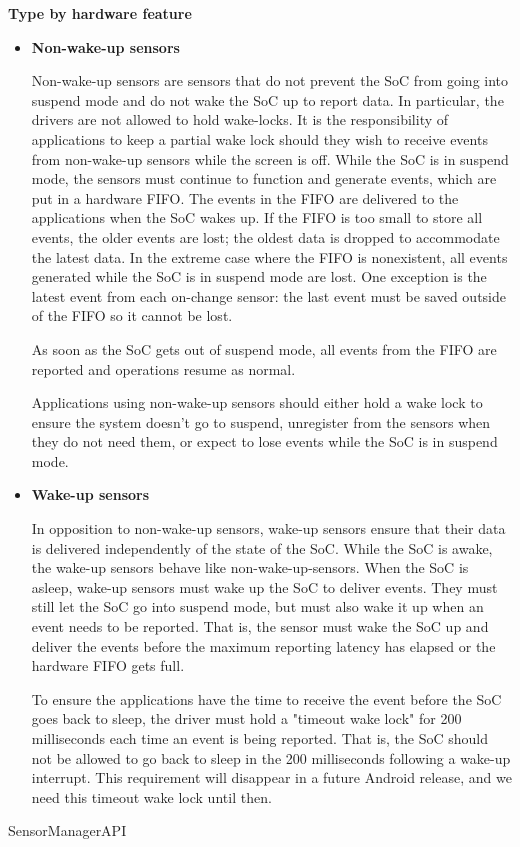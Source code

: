 \textbf{Type by hardware feature}
\begin{itemize}
\item \textbf{Non-wake-up sensors}

  Non-wake-up sensors are sensors that do not prevent the SoC from going into
  suspend mode and do not wake the SoC up to report data. In particular, the
  drivers are not allowed to hold wake-locks. It is the responsibility of
  applications to keep a partial wake lock should they wish to receive events
  from non-wake-up sensors while the screen is off. While the SoC is in suspend
  mode, the sensors must continue to function and generate events, which are put
  in a hardware FIFO.
  The events in the FIFO are delivered to the applications when the SoC wakes
  up. If the FIFO is too small to store all events, the older events are lost;
  the oldest data is dropped to accommodate the latest data. In the extreme case
  where the FIFO is nonexistent, all events generated while the SoC is in
  suspend mode are lost. One exception is the latest event from each on-change
  sensor: the last event must be saved outside of the FIFO so it cannot be lost.

  As soon as the SoC gets out of suspend mode, all events from the FIFO are
  reported and operations resume as normal.

  Applications using non-wake-up sensors should either hold a wake lock to
  ensure the system doesn't go to suspend, unregister from the sensors when they
  do not need them, or expect to lose events while the SoC is in suspend mode.

\item \textbf{Wake-up sensors}

  In opposition to non-wake-up sensors, wake-up sensors ensure that their data
  is delivered independently of the state of the SoC. While the SoC is awake,
  the wake-up sensors behave like non-wake-up-sensors. When the SoC is asleep,
  wake-up sensors must wake up the SoC to deliver events. They must still let
  the SoC go into suspend mode, but must also wake it up when an event needs to
  be reported. That is, the sensor must wake the SoC up and deliver the events
  before the maximum reporting latency has elapsed or the hardware FIFO gets
  full. %

  To ensure the applications have the time to receive the event before the SoC
  goes back to sleep, the driver must hold a "timeout wake lock" for 200
  milliseconds each time an event is being reported. That is, the SoC should not
  be allowed to go back to sleep in the 200 milliseconds following a wake-up
  interrupt. This requirement will disappear in a future Android release, and we
  need this timeout wake lock until then.
\end{itemize}


{SensorManagerAPI}



